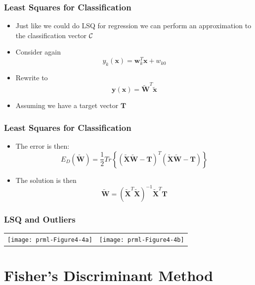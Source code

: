 \documentclass[10pt]{beamer}
\begin{document}
\begin{frame}
  \frametitle{Least Squares for Classification}
  \begin{itemize}
  \item Just like we could do LSQ for regression we can perform an
    approximation to the classification vector ${\cal C}$
  \item Consider again
    \[
    y_k({\mathbf x}) = {\mathbf w}_k^T {\mathbf x} + w_{k0}
    \]
  \item Rewrite to 
    \[
    {\mathbf y}({\mathbf x}) = \tilde{{\mathbf W}}^T \tilde{{\mathbf x}}
    \]
  \item Assuming we have a target vector ${\mathbf T}$
  \end{itemize}
\end{frame}

\begin{frame}
  \frametitle{Least Squares for Classification}
  \begin{itemize}
  \item The error is then:
    \[
    E_D(\tilde{\mathbf W}) = \frac{1}{2} Tr\left\{ (\tilde{\mathbf
        X}\tilde{\mathbf W} - {\mathbf T})^T(\tilde{\mathbf
        X}\tilde{\mathbf W} - {\mathbf T})\right\}
    \]
  \item The solution is then
    \[
    \tilde{\mathbf W} = \left( \tilde{\mathbf X}^T \tilde{\mathbf X}
    \right)^{-1} \tilde{\mathbf X}^T {\mathbf T}
    \]
  \end{itemize}
\end{frame}

\begin{frame}
  \frametitle{LSQ and Outliers}
  \begin{center}
    \begin{tabular}[c]{cc}
      \texttt{[image: prml-Figure4-4a]} &
      \texttt{[image: prml-Figure4-4b]}
    \end{tabular}
  \end{center}
\end{frame}

\section[Fisher's Method]{Fisher's Discriminant Method}
\end{document}
